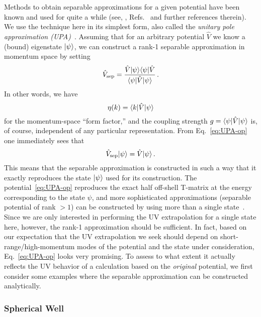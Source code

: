 	Methods to obtain separable approximations for a given potential have
	been known and used for quite a while (see, \eg,
	Refs.~\cite{Harms:1970hd,Ernst:1973zzb,elgaroy1998} and further references
	therein).  We use the technique here in its simplest form, also called
	the \emph{unitary pole approximation
	(UPA)}~\cite{Ernst:1973zzb,Lovelace:1964aa}.  Assuming that for an
	arbitrary potential $\hat{V}$ we know a (bound) eigenstate ${|\psi\rangle}$, we
	can	construct a rank-1 separable approximation in momentum space by setting
	\begin{equation}
	 \hat{V}_\text{sep} = \frac{\hat{V}{|\psi\rangle}{\langle\psi|}\hat{V}}
	 {\langle \psi|\hat{V}|\psi\rangle} \,.
	\label{eq:UPA-op}
	\end{equation}
	In other words, we have
	\begin{equation}
	 \eta(k) = \langle k|\hat{V}|\psi\rangle
	\end{equation}
	for the momentum-space ``form factor,'' and the coupling strength
	$g=\langle \psi|\hat{V}|\psi\rangle$ is, of course, independent of any
	particular representation.  From Eq.~\eqref{eq:UPA-op} one immediately sees
	that
	\begin{equation}
	 \hat{V}_\text{sep}{|\psi\rangle} = \hat{V}{|\psi\rangle} \,.
	\label{eq:Vsep-psi-V-psi}
	\end{equation}
	This means that the separable approximation is constructed in such a
	way that it exactly reproduces the state ${|\psi\rangle}$ used for its
	construction.  The potential~\eqref{eq:UPA-op} reproduces the exact
	half off-shell T-matrix at the energy corresponding to the state
	$\psi$, and more sophisticated approximations (separable potential of
	rank $>1$) can be constructed by using more than a single
	state~\cite{Ernst:1973zzb}.  Since we are only interested in
	performing the UV extrapolation for a single state here, however, the
	rank-1 approximation should be sufficient.  In fact, based on our
	expectation that the UV extrapolation we seek should depend on
	short-range/high-momentum modes of the potential and the state under
	consideration, Eq.~\eqref{eq:UPA-op} looks very promising.  To assess
	to what extent it actually reflects the UV behavior of a calculation
	based on the \emph{original} potential, we first consider some
	examples where the separable approximation can be constructed
	analytically.

	\medskip
	\subsubsection{Spherical Well}

